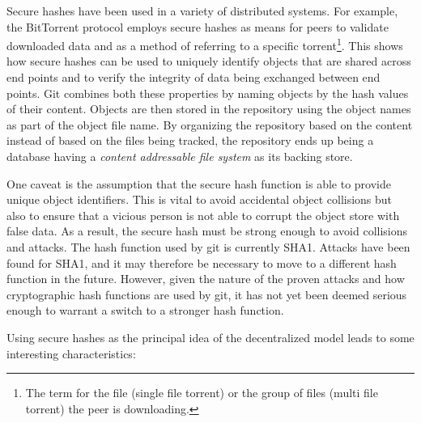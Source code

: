 Secure hashes have been used in a variety of distributed systems. For
example, the BitTorrent protocol employs secure hashes as means for
peers to validate downloaded data and as a method of referring to a
specific torrent\footnote{The term for the file (single file torrent)
or the group of files (multi file torrent) the peer is downloading.}.
This shows how secure hashes can be used to uniquely identify
objects that are shared across end points and to verify the integrity
of data being exchanged between end points.  Git combines both these
properties by naming objects by the hash values of their content.
Objects are then stored in the repository using the object names as
part of the object file name. By organizing the repository based on
the content instead of based on the files being tracked, the
repository ends up being a database having a \emph{content addressable
file system} as its backing store.


One caveat is the assumption that the secure hash function is able to
provide unique object identifiers. This is vital to avoid accidental
object collisions but also to ensure that a vicious person is not able
to corrupt the object store with false data. As a result, the secure
hash must be strong enough to avoid collisions and attacks. The hash
function used by git is currently SHA1. Attacks have been found for
SHA1, and it may therefore be necessary to move to a different hash
function in the future.  However, given the nature of the proven
attacks and how cryptographic hash functions are used by git, it has
not yet been deemed serious enough to warrant a switch to a stronger
hash function.

Using secure hashes as the principal idea of the decentralized model
leads to some interesting characteristics:

